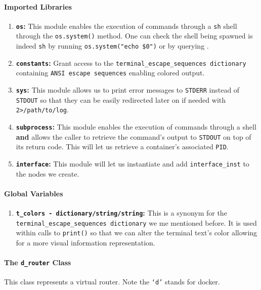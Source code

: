    \paragraph{Imported Libraries}
        \begin{enumerate}
            \item \textbf{\texttt{os}:} This module enables the execution of commands through a \texttt{sh} shell through the \texttt{os.system()} method. One can check the shell being spawned is indeed \texttt{sh} by running \texttt{\allowbreak os.system("echo \$0")} or by querying \cite{bib:man-system}.
            \item \textbf{\texttt{constants}:} Grant access to the \texttt{\allowbreak terminal\_escape\_sequences dictionary} containing \texttt{ANSI escape sequences} enabling colored output.
            \item \textbf{\texttt{sys}:} This module allows us to print error messages to \texttt{STDERR} instead of \texttt{STDOUT} so that they can be easily redirected later on if needed with \texttt{2>/path/to/log}.
            \item \textbf{\texttt{subprocess}:} This module enables the execution of commands through a shell \textbf{and} allows the caller to retrieve the command's output to \texttt{STDOUT} on top of its return code. This will let us retrieve a container's associated \texttt{PID}.
            \item \textbf{\texttt{interface}:} This module will let us instantiate and add \texttt{interface\_inst} to the nodes we create.
        \end{enumerate}

    \paragraph{Global Variables}
        \begin{enumerate}
            \item \textbf{\texttt{\allowbreak t\_colors - dictionary/string/string}:} This is a synonym for the \texttt{\allowbreak terminal\_escape\_sequences dictionary} we me mentioned before. It is used within calls to \texttt{print()} so that we can alter the terminal text's color allowing for a more visual information representation.
        \end{enumerate}

    \paragraph{The \texttt{d\_router} Class}
        This class represents a virtual router. Note the \texttt{`d'} stands for docker.

